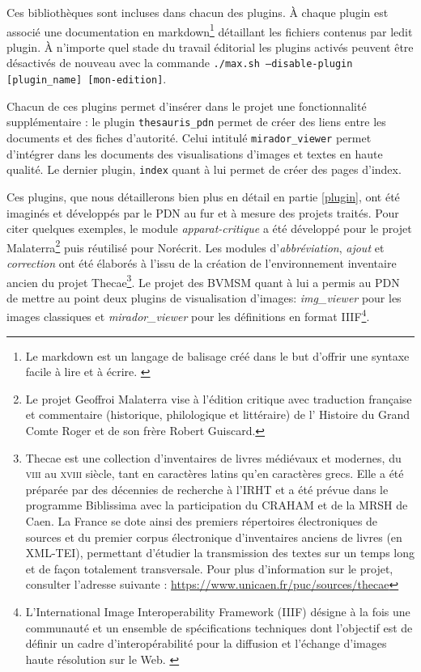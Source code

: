 \documentclass[a4paper,12pt,twoside]{book}
\begin{document}
Ces bibliothèques sont incluses dans chacun des plugins.
À chaque plugin est associé une documentation en markdown\footnote{Le markdown est un langage de balisage créé dans le but d'offrir une syntaxe facile à lire et à écrire. \cite{markdown}} détaillant les fichiers contenus par ledit plugin.
À n'importe quel stade du travail éditorial les plugins activés peuvent être désactivés de nouveau avec la commande \texttt{./max.sh --disable-plugin [plugin\_name] [mon-edition]}.

Chacun de ces plugins permet d'insérer dans le projet une fonctionnalité supplémentaire : le plugin \texttt{thesauris\_pdn} permet de créer des liens entre les documents et des fiches d'autorité. Celui intitulé \texttt{mirador\_viewer} permet d'intégrer dans les documents des visualisations d'images et textes en haute qualité. Le dernier plugin, \texttt{index} quant à lui permet de créer des pages d'index.

Ces plugins, que nous détaillerons bien plus en détail en partie \ref{plugin}, ont été imaginés et développés par le \acrshort{PDN} au fur et à mesure des projets traités. Pour citer quelques exemples, le module \textit{apparat-critique} a été développé pour le projet Malaterra\footnote{Le projet Geoffroi  Malaterra vise à l'édition critique avec traduction française et commentaire (historique, philologique et littéraire) de l' Histoire du Grand Comte Roger et de son frère Robert Guiscard.} puis réutilisé pour Norécrit. Les modules d'\textit{abbréviation}, \textit{ajout} et \textit{correction} ont été élaborés à l'issu de la création de l'environnement inventaire ancien du projet Thecae\footnote{Thecae est une collection d'inventaires de livres médiévaux et modernes, du \textsc{viii}\ieme{} au \textsc{xviii}\ieme{} siècle, tant en caractères latins qu'en caractères grecs. Elle a été préparée par des décennies de recherche à l'IRHT et a été prévue dans le programme Biblissima avec la participation du \acrshort{CRAHAM} et de la \acrshort{MRSH} de Caen. La France se dote ainsi des premiers répertoires électroniques de sources et du premier corpus électronique d'inventaires anciens de livres (en XML-TEI), permettant d'étudier la transmission des textes sur un temps long et de façon totalement transversale. Pour plus d'information sur le projet, consulter l'adresse suivante : \url{https://www.unicaen.fr/puc/sources/thecae}\label{thecae}}. Le projet des \acrshort{BVMSM} quant à lui a permis au \acrshort{PDN} de mettre au point deux plugins de visualisation d'images: \textit{img\_viewer} pour les images classiques et \textit{mirador\_viewer} pour les définitions en format \acrshort{IIIF}\footnote{L'International Image Interoperability Framework (IIIF) désigne à la fois une communauté et un ensemble de spécifications techniques dont l'objectif est de définir un cadre d'interopérabilité pour la diffusion et l'échange d'images haute résolution sur le Web. \cite{iiif-intro}}.
\end{document}
